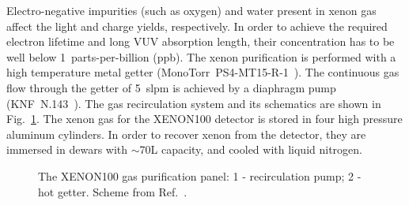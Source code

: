 Electro-negative impurities (such as oxygen) and water present in xenon gas affect the light and charge yields, respectively. In order to achieve the required electron lifetime and long VUV absorption length, their concentration has to be well below 1~parts-per-billion (ppb). The xenon purification is performed with a high temperature metal getter (MonoTorr~PS4-MT15-R-1~\cite{MonoTorr}). The continuous gas flow through the getter of 5~slpm is achieved by a diaphragm pump (KNF~N.143~\cite{KNFpump}). The gas recirculation system and its schematics are shown in Fig.~\ref{figPurificationPanel}. The xenon gas for the XENON100 detector is stored in four high pressure aluminum cylinders. In order to recover xenon from the detector, they are immersed in dewars with $\sim$70L capacity, and cooled with liquid nitrogen. 

\begin{figure}[!h]
\centering
{}
\caption[The XENON100 gas purification panel]{The XENON100 gas purification panel: 1 - recirculation pump; 2 - hot getter. Scheme from Ref.~\cite{xe100-instrument}.}
\label{figPurificationPanel}
\end{figure}

